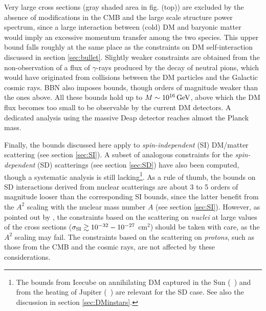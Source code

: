 Very large cross sections (gray shaded area in fig. (top)) are excluded by the absence of modifications in the CMB and the large scale structure power spectrum, since a large interaction between (cold) DM and baryonic matter would imply an excessive momentum transfer among the two species. This upper bound falls roughly at the same place as the constraints on DM self-interaction discussed in section \ref{sec:bullet}.
Slightly weaker constraints are obtained from the non-observation of a flux of $\gamma$-rays produced by the decay of neutral pions, which would have originated from collisions between the DM particles and the Galactic cosmic rays. BBN also imposes bounds, though orders of magnitude weaker than the ones above. All these bounds hold up to $M  \sim 10^{16}\,{\rm GeV}$, above which the DM flux becomes too small to be observable by the current DM detectors. 
A dedicated analysis using the massive {\sc Deap} detector reaches almost the Planck mass. 

\bigskip



Finally, the bounds discussed here apply to {\em spin-independent} (SI) DM/matter scattering (see section \ref{sec:SI}). A subset of analogous constraints for the {\em spin-dependent} (SD) scatterings (see section \ref{sec:SD}) have also been computed, though a systematic analysis is still lacking\footnote{The bounds from {\sc Icecube} on annihilating DM captured in the Sun (~\cite{SIMP}) and from the heating of Jupiter (~\cite{DMandplanets}) are relevant for the SD case. See also the discussion in section \ref{sec:DMinstars}.}. As a rule of thumb, the bounds on SD interactions derived from nuclear scatterings are about 3 to 5 orders of magnitude looser than the corresponding SI bounds, since the latter benefit from the $A^2$ scaling with the nuclear mass number $A$ (see section \ref{sec:SI}).
However, as pointed out by , the constraints based on the scattering on {\em nuclei} at large values of the cross sections ($\sigma_{\rm SI} \gtrsim 10^{-32}- 10^{-27}$ cm$^2$) should be taken with care, as the $A^2$ scaling may fail.
The constraints based on the scattering on {\em protons}, such as those from the CMB and the cosmic rays, are not affected by these considerations.



